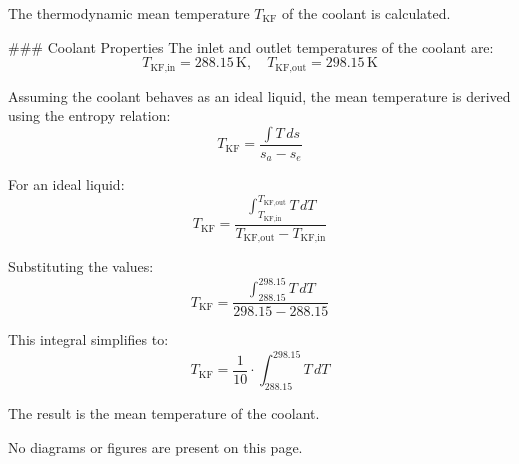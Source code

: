 The thermodynamic mean temperature \( T_{\text{KF}} \) of the coolant is calculated.  

### Coolant Properties  
The inlet and outlet temperatures of the coolant are:  
\[
T_{\text{KF,in}} = 288.15 \, \text{K}, \quad T_{\text{KF,out}} = 298.15 \, \text{K}
\]  

Assuming the coolant behaves as an ideal liquid, the mean temperature is derived using the entropy relation:  
\[
T_{\text{KF}} = \frac{\int T \, ds}{s_a - s_e}
\]  

For an ideal liquid:  
\[
T_{\text{KF}} = \frac{\int_{T_{\text{KF,in}}}^{T_{\text{KF,out}}} T \, dT}{T_{\text{KF,out}} - T_{\text{KF,in}}}
\]  

Substituting the values:  
\[
T_{\text{KF}} = \frac{\int_{288.15}^{298.15} T \, dT}{298.15 - 288.15}
\]  

This integral simplifies to:  
\[
T_{\text{KF}} = \frac{1}{10} \cdot \int_{288.15}^{298.15} T \, dT
\]  

The result is the mean temperature of the coolant.  

No diagrams or figures are present on this page.